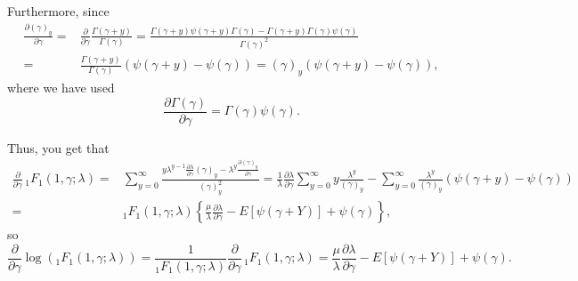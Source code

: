 Furthermore, since
\begin{equation}\label{derpochgamma}
\begin{split}
    \frac{\partial \left(\gamma\right)_{y}}{\partial \gamma} = & \frac{\partial}{\partial \gamma} \frac{\Gamma\left(\gamma+y\right)}{\Gamma\left(\gamma\right)} = \frac{\Gamma\left(\gamma+y\right) \psi\left(\gamma+y\right) \Gamma\left(\gamma\right) - \Gamma\left(\gamma+y\right) \Gamma\left(\gamma\right) \psi\left(\gamma\right)}{\Gamma\left(\gamma\right)^2} \\
    = & \frac{\Gamma\left(\gamma+y\right)}{\Gamma\left(\gamma\right)} \left(\psi\left(\gamma+y\right)- \psi\left(\gamma\right) \right) =  \left(\gamma\right)_{y} \left(\psi\left(\gamma+y\right)- \psi\left(\gamma\right) \right),
\end{split}
\end{equation}
where we have used
$$ \frac{\partial \Gamma\left(\gamma\right)}{\partial \gamma} =  \Gamma\left(\gamma\right) \psi\left(\gamma\right).$$

Thus, you get that
\begin{align*}
    \frac{\partial}{\partial \gamma} \, _{1}F_{1}\left(1, \gamma; \lambda \right) = & \sum_{y=0}^{\infty} \frac{y \lambda^{y-1} \frac{\partial \lambda}{\partial \gamma} \left(\gamma\right)_{y} - \lambda^y \frac{\partial \left(\gamma\right)_{y}}{\partial \gamma}}{\left(\gamma\right)_{y}^2} = \frac{1}{\lambda} \frac{\partial \lambda}{\partial \gamma} \sum_{y=0}^{\infty} y \frac{\lambda^{y}}{\left(\gamma\right)_{y}} - \sum_{y=0}^{\infty} \frac{\lambda^y}{\left(\gamma\right)_{y}} \left(\psi\left(\gamma+y\right)- \psi\left(\gamma\right) \right) \\
    = & _{1}F_{1}\left(1, \gamma; \lambda \right) \left\{ \frac{\mu}{\lambda} \frac{\partial \lambda}{\partial \gamma} - E \left[ \psi\left(\gamma+Y\right) \right] + \psi\left(\gamma\right) \right\},
\end{align*}
so
\begin{equation}\label{der1f1gamma}
    \frac{\partial}{\partial \gamma} \log \left(_{1}F_{1}\left(1, \gamma; \lambda \right) \right) = \frac{1}{_{1}F_{1}\left(1, \gamma; \lambda \right)} \frac{\partial}{\partial \gamma} \, _{1}F_{1}\left(1, \gamma; \lambda \right) =
    \frac{\mu}{\lambda} \frac{\partial \lambda}{\partial \gamma} - E \left[ \psi\left(\gamma+Y\right) \right] + \psi\left(\gamma\right).
\end{equation}

